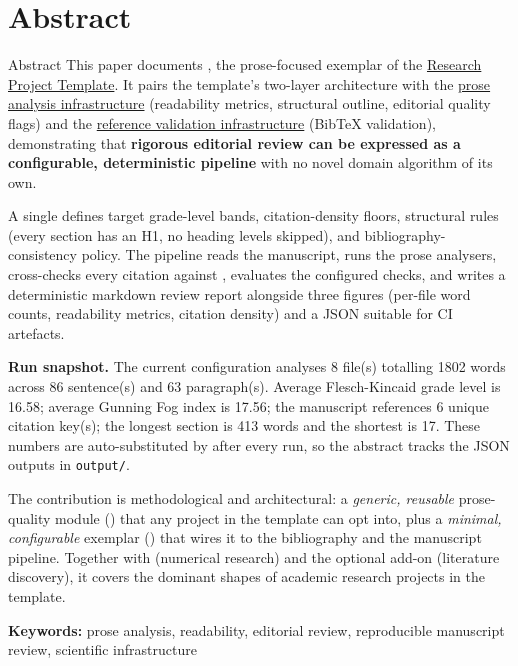 \documentclass[
  ignorenonframetext,
]{beamer}
\author{\texorpdfstring{}{}}
\date{}
\begin{document}
\section{Abstract}\label{sec:abstract}

\begin{frame}{Abstract}
This paper documents , the
prose-focused exemplar of the
\href{https://github.com/docxology/template}{Research Project Template}.
It pairs the template's two-layer architecture with the
\href{https://github.com/docxology/template/tree/main/infrastructure/prose}{prose
analysis infrastructure} (readability metrics, structural outline,
editorial quality flags) and the
\href{https://github.com/docxology/template/tree/main/infrastructure/reference}{reference
validation infrastructure} (BibTeX validation), demonstrating that
\textbf{rigorous editorial review can be expressed as a configurable,
deterministic pipeline} with no novel domain algorithm of its own.

A single  defines target grade-level
bands, citation-density floors, structural rules (every section has an
H1, no heading levels skipped), and bibliography-consistency policy. The
pipeline reads the manuscript, runs the prose analysers, cross-checks
every \texttt{\breakseq{[@key]}} citation against
, evaluates the configured checks, and
writes a deterministic markdown review report alongside three figures
(per-file word counts, readability metrics, citation density) and a JSON
 suitable for CI artefacts.

\textbf{Run snapshot.} The current configuration analyses 8 file(s)
totalling 1802 words across 86 sentence(s) and 63 paragraph(s). Average
Flesch-Kincaid grade level is 16.58; average Gunning Fog index is 17.56;
the manuscript references 6 unique citation key(s); the longest section
is 413 words and the shortest is 17. These numbers are auto-substituted
by  after every
run, so the abstract tracks the JSON outputs in \texttt{output/}.

The contribution is methodological and architectural: a \emph{generic,
reusable} prose-quality module () that any
project in the template can opt into, plus a \emph{minimal,
configurable} exemplar ()
that wires it to the bibliography and the manuscript pipeline. Together
with  (numerical research) and the
optional  add-on
(literature discovery), it covers the dominant shapes of academic
research projects in the template.

\textbf{Keywords:} prose analysis, readability, editorial review,
reproducible manuscript review, scientific infrastructure
\end{frame}
\end{document}
